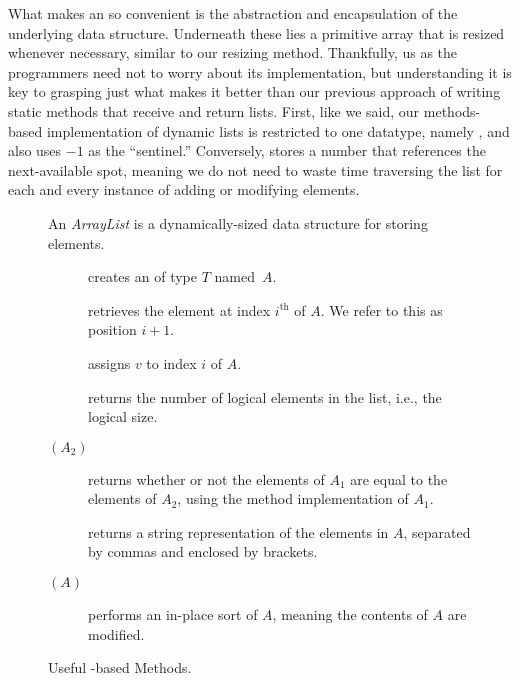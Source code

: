What makes an  so convenient is the abstraction and encapsulation of the underlying data structure. Underneath these lies a primitive array that is resized whenever necessary, similar to our resizing method. Thankfully, us as the programmers need not to worry about its implementation, but understanding it is key to grasping just what makes it better than our previous approach of writing static methods that receive and return lists. First, like we said, our methods-based implementation of dynamic lists is restricted to one datatype, namely , and also uses $-1$ as the ``sentinel.'' Conversely,  stores a number that references the next-available spot, meaning we do not need to waste time traversing the list for each and every instance of adding or modifying elements.

\begin{figure}[tp]
  \small
  \begin{tcolorbox}[title=Java Array Lists]
    An \textit{ArrayList} is a dynamically-sized data structure for storing elements.
    \vspace{2ex}
  \begin{description}
    \item [] creates an  of type $T$ named~$A$.
    \item [] retrieves the element at index $i^{\text{th}}$ of $A$. We refer to this as position $i + 1$. 
    \item [] assigns $v$ to index $i$ of $A$.
    \item [] returns the number of logical elements in the list, i.e., the logical size.
    \item [$(A_2)$] returns whether or not the elements of $A_1$ are equal to the elements of $A_2$, using the  method implementation of $A_1$.
    \item [] returns a string representation of the elements in $A$, separated by commas and enclosed by brackets.
    \item [$(A)$] performs an in-place sort of $A$, meaning the contents of $A$ are modified.
  \end{description}
\end{tcolorbox}
  \caption{Useful -based Methods.}
  \label{fig:arraylists}
\end{figure}

